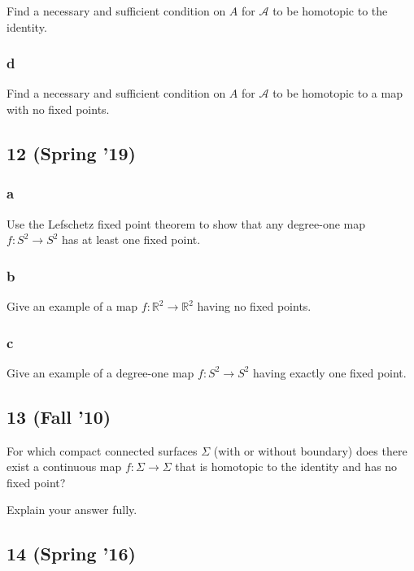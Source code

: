 Find a necessary and sufficient condition on \(A\) for \({\mathcal{A}}\)
to be homotopic to the identity.

\hypertarget{d}{%
\subsubsection{d}\label{d}}

Find a necessary and sufficient condition on \(A\) for \({\mathcal{A}}\)
to be homotopic to a map with no fixed points.

\hypertarget{spring-19-5}{%
\subsection{12 (Spring '19)}\label{spring-19-5}}

\hypertarget{a-7}{%
\subsubsection{a}\label{a-7}}

Use the Lefschetz fixed point theorem to show that any degree-one map
\(f : S^2 \to S^2\) has at least one fixed point.

\hypertarget{b-7}{%
\subsubsection{b}\label{b-7}}

Give an example of a map \(f : {\mathbb{R}}^2 \to {\mathbb{R}}^2\)
having no fixed points.

\hypertarget{c-3}{%
\subsubsection{c}\label{c-3}}

Give an example of a degree-one map \(f : S^2 \to S^2\) having exactly
one fixed point.

\hypertarget{fall-10-3}{%
\subsection{13 (Fall '10)}\label{fall-10-3}}

For which compact connected surfaces \(\Sigma\) (with or without
boundary) does there exist a continuous map \(f : \Sigma \to \Sigma\)
that is homotopic to the identity and has no fixed point?

Explain your answer fully.

\hypertarget{spring-16-3}{%
\subsection{14 (Spring '16)}\label{spring-16-3}}

